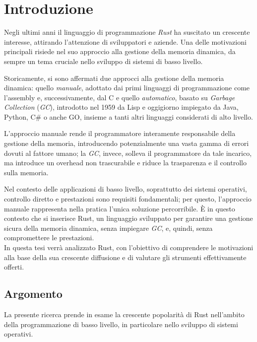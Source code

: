 
\chapter{Introduzione}\label{cap:01}
Negli ultimi anni il linguaggio di programmazione \textit{Rust} ha suscitato 
un crescente interesse, attirando l'attenzione di sviluppatori e aziende.
Una delle motivazioni principali risiede nel suo approccio alla 
gestione della memoria dinamica, da sempre un tema cruciale nello sviluppo di sistemi di basso livello.

Storicamente, si sono affermati due approcci alla gestione della memoria dinamica: 
quello \textit{manuale}, adottato dai primi linguaggi di programmazione come 
l'assembly e, successivamente, dal C
e quello \textit{automatico}, basato su \textit{Garbage Collection} (\textit{GC}), introdotto nel 1959 
da Lisp e oggigiorno impiegato da Java, Python, C\# o anche GO, insieme a tanti altri linguaggi considerati di alto livello. 

L'approccio manuale rende il programmatore interamente responsabile 
della gestione della memoria, introducendo potenzialmente una vasta gamma di errori dovuti al 
fattore umano; la \textit{GC}, invece, solleva il programmatore 
da tale incarico, ma introduce un overhead non trascurabile e riduce 
la trasparenza e il controllo sulla memoria.

Nel contesto delle applicazioni di basso livello, soprattutto dei sistemi 
operativi, controllo diretto e prestazioni sono requisiti fondamentali; 
per questo, l'approccio manuale rappresenta nella pratica l'unica soluzione percorribile.
È in questo contesto che si inserisce Rust, un linguaggio sviluppato per 
garantire una gestione sicura della memoria dinamica, senza impiegare \textit{GC}, e, 
quindi, senza compromettere le prestazioni. \hfill 
\vspace{8pt}\\
\noindent In questa tesi verrà analizzato Rust, con l'obiettivo di comprendere le 
motivazioni alla base della sua crescente diffusione e di valutare gli 
strumenti effettivamente offerti.

\section{Argomento}
La presente ricerca prende in esame la crescente popolarità di Rust nell'ambito
 della programmazione di basso livello, in particolare nello sviluppo di sistemi operativi.

